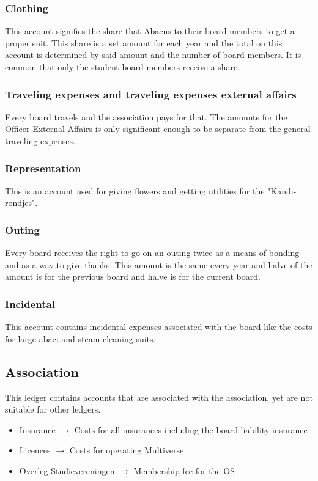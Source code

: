 \documentclass{report}
\begin{document}
\subsubsection{Clothing}
This account signifies the share that Abacus to their board members to get a proper suit. This share is a set amount for each year and the total on this account is determined by said amount and the number of board members. It is common that only the student board members receive a share.
\subsubsection{Traveling expenses and traveling expenses external affairs}
Every board travels and the association pays for that. The amounts for the Officer External Affairs is only significant enough to be separate from the general traveling expenses. 
\subsubsection{Representation}
This is an account used for giving flowers and getting utilities for the "Kandi-rondjes".
\subsubsection{Outing}
Every board receives the right to go on an outing twice as a means of bonding and as a way to give thanks. This amount is the same every year and halve of the amount is for the previous board and halve is for the current board. 
\subsubsection{Incidental}
This account contains incidental expenses associated with the board like the costs for large abaci and steam cleaning suits. 
\subsection{Association}
This ledger contains accounts that are associated with the association, yet are not suitable for other ledgers. 
\begin{itemize}
	\item Insurance $\rightarrow$ Costs for all insurances including the board liability insurance
	\item Licences $\rightarrow$ Costs for operating Multiverse
	\item Overleg Studievereningen $\rightarrow$ Membership fee for the OS
\end{itemize}
\end{document}

